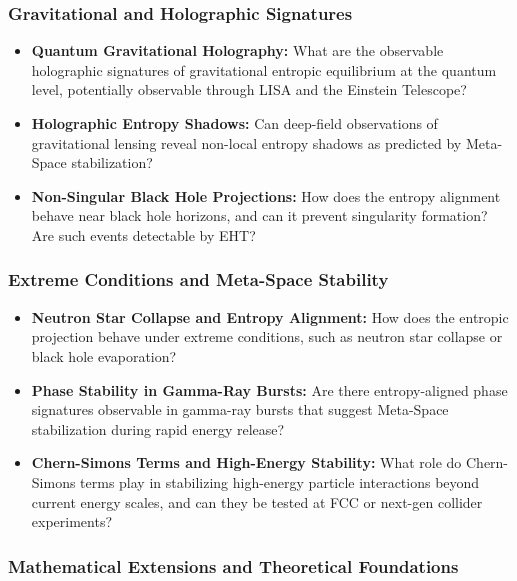 \documentclass[10.5pt,a4paper]{article}
\begin{document}
\subsubsection{Gravitational and Holographic Signatures}

\begin{itemize}
    \item \textbf{Quantum Gravitational Holography:} What are the observable holographic signatures of gravitational entropic equilibrium at the quantum level, potentially observable through LISA and the Einstein Telescope?

    \item \textbf{Holographic Entropy Shadows:} Can deep-field observations of gravitational lensing reveal non-local entropy shadows as predicted by Meta-Space stabilization?

    \item \textbf{Non-Singular Black Hole Projections:} How does the entropy alignment behave near black hole horizons, and can it prevent singularity formation? Are such events detectable by EHT?
\end{itemize}

\subsubsection{Extreme Conditions and Meta-Space Stability}

\begin{itemize}
    \item \textbf{Neutron Star Collapse and Entropy Alignment:} How does the entropic projection behave under extreme conditions, such as neutron star collapse or black hole evaporation?

    \item \textbf{Phase Stability in Gamma-Ray Bursts:} Are there entropy-aligned phase signatures observable in gamma-ray bursts that suggest Meta-Space stabilization during rapid energy release?

    \item \textbf{Chern-Simons Terms and High-Energy Stability:} What role do Chern-Simons terms play in stabilizing high-energy particle interactions beyond current energy scales, and can they be tested at FCC or next-gen collider experiments?
\end{itemize}

\subsubsection{Mathematical Extensions and Theoretical Foundations}
\end{document}
